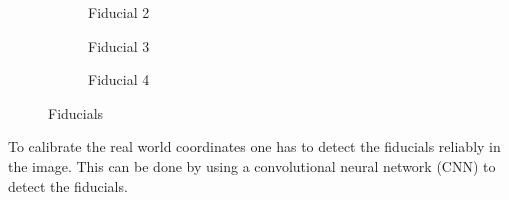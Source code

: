 \begin{figure}[H]
\begin{subfigure}{.2\textwidth}
        \caption[originalRainbow]{Fiducial 2}
        \label{fig:fid_2}
    \end{subfigure}
    \begin{subfigure}{.2\textwidth}
        \centering
        \caption[originalRainbow]{Fiducial 3}
        \label{fig:fid_3}
    \end{subfigure}
    \begin{subfigure}{.2\textwidth}
        \centering
        \caption[originalRainbow]{Fiducial 4}
        \label{fig:fid_4}
    \end{subfigure}
    \caption{Fiducials}
    \label{fig:fiducials_all}
\end{figure}
To calibrate the real world coordinates one has to detect the fiducials reliably in the image.
This can be done by using a convolutional neural network (CNN)\autocite{cnn} to detect the fiducials.

